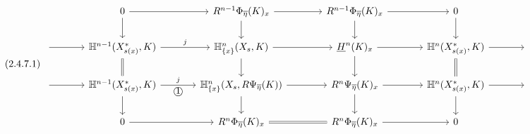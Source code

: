 \begin{equation}\tag{2.4.7.1}
\begin{tikzcd}[column sep=large]
{} & 0 \arrow[r] \arrow[d] & R^{n-1}\Phi_{\overline{\eta}}(K)_x \arrow[r] \arrow[d] & R^{n-1}\Phi_{\overline{\eta}}(K)_x \arrow[r] \arrow[d] & 0 \arrow[d] & {} \\
{} \arrow[r] & \mathbb{H}^{n-1}(X^{*}_{s(x)},K) \arrow[r, "j"] \arrow[d, equal] & \mathbb{H}^{n}_{\{x\}}(X_s, K) \arrow[r] \arrow[d] & \underline{H}^{n}(K)_x \arrow[r] \arrow[d] & \mathbb{H}^{n}(X^{*}_{s(x)}, K) \arrow[r] \arrow[d, equal] & {} \\
{} \arrow[r] & \mathbb{H}^{n-1}(X^{*}_{s(x)}, K) \arrow[r, "j", "\mbox{\textcircled{1}}"'] \arrow[d] & \mathbb{H}^{n}_{\{x\}}(X_s, R\Psi_{\overline{\eta}}(K)) \arrow[r] \arrow[d] & R^{n}\Psi_{\overline{\eta}}(K)_x \arrow[r] \arrow[d] & \mathbb{H}^{n}(X^{*}_{s(x)},K) \arrow[r] \arrow[d] & {} \\
{} & 0 \arrow[r] & R^{n}\Phi_{\overline{\eta}}(K)_x \arrow[r, equal] & R^{n}\Phi_{\overline{\eta}}(K)_x \arrow[r] & 0 &
{} \end{tikzcd}
\end{equation}
